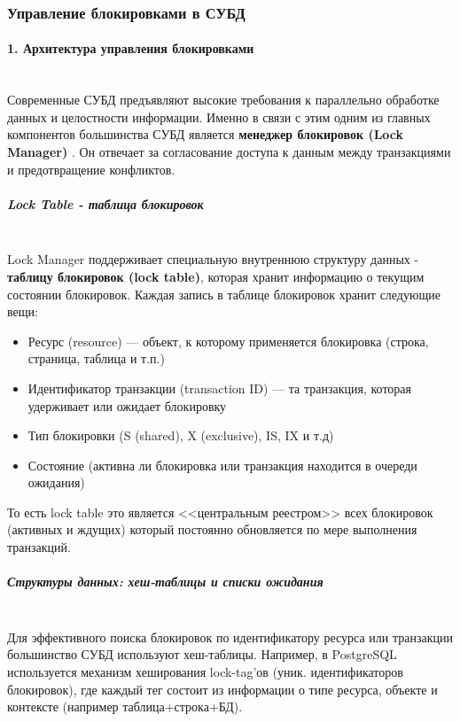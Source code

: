 \subsubsection{Управление блокировками в СУБД}
\paragraph{1. Архитектура управления блокировками} ~\\

Современные СУБД предъявляют высокие требования к параллельно обработке данных и целостности информации. Именно в связи с этим одним из главных компонентов большинства СУБД является \textbf{менеджер блокировок (Lock Manager)} \autocite{Silberschatz}. Он отвечает за согласование доступа к данным между транзакциями и предотвращение конфликтов.

\subparagraph{Lock Table - таблица блокировок} ~\\

 Lock Manager поддерживает специальную внутреннюю структуру данных - \textbf{таблицу блокировок (lock table)}, которая хранит информацию о текущим состоянии блокировок. Каждая запись в таблице блокировок хранит следующие вещи:
 \begin{itemize}
     \item Ресурс (resource) — объект, к которому применяется блокировка (строка, страница, таблица и т.п.)
     \item Идентификатор транзакции (transaction ID) — та транзакция, которая удерживает или ожидает блокировку
     \item Тип блокировки (S (shared), X (exclusive), IS, IX и т.д)
     \item Состояние (активна ли блокировка или транзакция находится в очереди ожидания)
 \end{itemize}
 То есть lock table это является <<центральным реестром>> всех блокировок (активных и ждущих) который постоянно обновляется по мере выполнения транзакций.

\subparagraph{Структуры данных: хеш-таблицы и списки ожидания} ~\\

 Для эффективного поиска блокировок по идентификатору ресурса или транзакции большинство СУБД используют хеш-таблицы. Например, в PostgreSQL используется механизм хеширования lock-tag'ов (уник. идентификаторов блокировок), где каждый тег состоит из информации о типе ресурса, объекте и контексте (например таблица+строка+БД).
 
